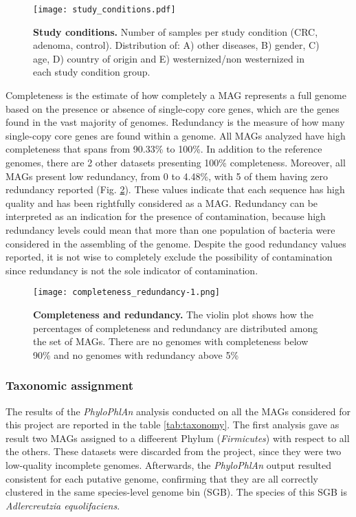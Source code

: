 \begin{figure}[!h]
    \centering
    \texttt{[image: study\_conditions.pdf]}
    \caption{\textbf{Study conditions.} Number of samples per study condition (CRC, adenoma, control). Distribution of: A) other diseases, B) gender, C) age, D) country of origin and E) westernized/non westernized in each study condition group.}
    \label{fig:studyConditions}
\end{figure}

Completeness is the estimate of how completely a MAG represents a full genome based on the presence or absence of single-copy core genes, which are the genes found in the vast majority of genomes. Redundancy is the measure of how many single-copy core genes are found within a genome\cite{anvio}. All MAGs analyzed have high completeness that spans from 90.33\% to 100\%. In addition to the reference genomes, there are 2 other datasets presenting 100\% completeness. Moreover, all MAGs present low redundancy, from 0 to 4.48\%, with 5 of them having zero redundancy reported (Fig. \ref{fig:completeness}). These values indicate that each sequence has high quality and has been rightfully considered as a MAG. Redundancy can be interpreted as an indication for the presence of contamination, because high redundancy levels could mean that more than one population of bacteria were considered in the assembling of the genome. Despite the good redundancy values reported, it is not wise to completely exclude the possibility of contamination since redundancy is not the sole indicator of contamination.

\begin{figure}[!h]
    \centering
    \texttt{[image: completeness\_redundancy-1.png]}
    \caption{\textbf{Completeness and redundancy.} The violin plot shows how the percentages of completeness and redundancy are distributed among the set of MAGs. There are no genomes with completeness below 90\% and no genomes with redundancy above 5\%}
    \label{fig:completeness}
\end{figure}

\subsubsection*{Taxonomic assignment}

The results of the \textit{PhyloPhlAn} analysis conducted on all the MAGs considered for this project are reported in the table \ref{tab:taxonomy}. The first analysis gave as result two MAGs assigned to a diffeerent Phylum (\textit{Firmicutes}) with respect to all the others. These datasets were discarded from the project, since they were two low-quality incomplete genomes. Afterwards, the \textit{PhyloPhlAn} output resulted consistent for each putative genome, confirming that they are all correctly clustered in the same species-level genome bin (SGB). The species of this SGB is \textit{Adlercreutzia equolifaciens}.\\

